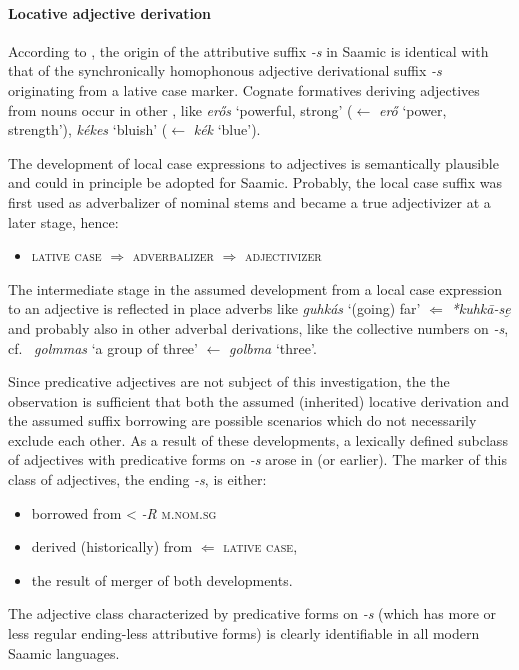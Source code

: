 {\paragraph{Locative adjective derivation}
According to \citet[96]{bergsland1946}, the origin of the attributive suffix \textit{-s} in Saamic is identical with that of the synchronically homophonous adjective derivational suffix \textit{-s} originating from a lative case marker. Cognate formatives deriving adjectives from nouns occur in other , like  \textit{erős} ‘powerful, strong’ ($\leftarrow$ \textit{erő} ‘power, strength’), \textit{kékes} ‘bluish’ ($\leftarrow$ \textit{kék} ‘blue’).

The development of local case expressions to adjectives is semantically plausible and could in principle be adopted for Saamic. Probably, the local case suffix was first used as adverbalizer of nominal stems and became a true adjectivizer at a later stage, hence:
\begin{itemize}
\item \textsc{lative case} $\Rightarrow$ \textsc{adverbalizer} $\Rightarrow$ \textsc{adjectivizer}
\end{itemize}
The intermediate stage in the assumed development from a local case expression to an adjective is reflected in place adverbs like  \textit{guhkás} ‘(going) far’ $\Leftarrow$  \textit{*kuhkā-se̮} \cite[246]{sammallahti1998b} and probably also in other adverbal derivations, like the collective numbers on \textit{-s}, cf.~ \textit{golmmas} ‘a group of three’ $\leftarrow$ \textit{golbma} ‘three’.

Since predicative adjectives are not subject of this investigation, the the observation is sufficient that both the assumed (inherited) locative derivation and the assumed suffix borrowing are possible scenarios which do not necessarily exclude each other. As a result of these developments, a lexically defined subclass of adjectives with predicative forms on \textit{-s} arose in  (or earlier). The marker of this class of adjectives, the ending \textit{-s}, is either:
\begin{itemize}
\item borrowed from <  \textit{-R} \textsc{m.nom.sg}
\item derived (historically) from $\Leftarrow$ \textsc{lative case}, %
\item the result of merger of both developments.
\end{itemize}
\noindent The adjective class characterized by predicative forms on \textit{-s} (which has more or less regular ending-less attributive forms) is clearly identifiable in all modern Saamic languages.

}
